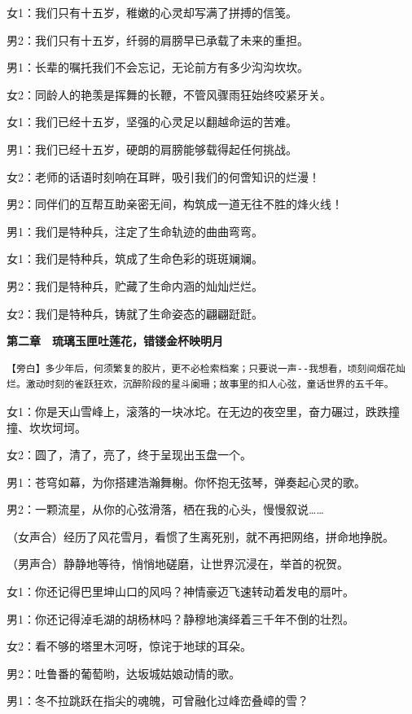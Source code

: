 \documentclass[openany]{ctexbook}
\begin{document}
女1：我们只有十五岁，稚嫩的心灵却写满了拼搏的信笺。

男2：我们只有十五岁，纤弱的肩膀早已承载了未来的重担。

男1：长辈的嘱托我们不会忘记，无论前方有多少沟沟坎坎。

女2：同龄人的艳羡是挥舞的长鞭，不管风骤雨狂始终咬紧牙关。

女1：我们已经十五岁，坚强的心灵足以翻越命运的苦难。

男1：我们已经十五岁，硬朗的肩膀能够载得起任何挑战。

女2：老师的话语时刻响在耳畔，吸引我们的何啻知识的烂漫！

男2：同伴们的互帮互助亲密无间，构筑成一道无往不胜的烽火线！

男1：我们是特种兵，注定了生命轨迹的曲曲弯弯。

女1：我们是特种兵，筑成了生命色彩的斑斑斓斓。

男2：我们是特种兵，贮藏了生命内涵的灿灿烂烂。

女2：我们是特种兵，铸就了生命姿态的翩翩跹跹。

\textbf{第二章　琉璃玉匣吐莲花，错镂金杯映明月}

\begin{verbatim}
【旁白】多少年后，何须繁复的胶片，更不必检索档案；只要说一声--我想看，顷刻间烟花灿烂。激动时刻的雀跃狂欢，沉醉阶段的星斗阑珊；故事里的扣人心弦，童话世界的五千年。
\end{verbatim}

女1：你是天山雪峰上，滚落的一块冰坨。在无边的夜空里，奋力碾过，跌跌撞撞、坎坎坷坷。

女2：圆了，清了，亮了，终于呈现出玉盘一个。

男1：苍穹如幕，为你搭建浩瀚舞榭。你怀抱无弦琴，弹奏起心灵的歌。

男2：一颗流星，从你的心弦滑落，栖在我的心头，慢慢叙说\ldots{}\ldots{}

（女声合）经历了风花雪月，看惯了生离死别，就不再把网络，拼命地挣脱。

（男声合）静静地等待，悄悄地磋磨，让世界沉浸在，举首的祝贺。

女1：你还记得巴里坤山口的风吗？神情豪迈飞速转动着发电的扇叶。

男1：你还记得淖毛湖的胡杨林吗？静穆地演绎着三千年不倒的壮烈。

女2：看不够的塔里木河呀，惊诧于地球的耳朵。

男2：吐鲁番的葡萄哟，达坂城姑娘动情的歌。

男1：冬不拉跳跃在指尖的魂魄，可曾融化过峰峦叠嶂的雪？
\end{document}
